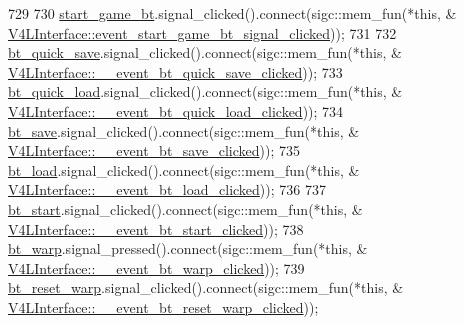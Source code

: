 \begin{DoxyCode}
729 
730         \hyperlink{class_v_s_s_s___g_u_i_1_1_v4_l_interface_a3785113cc8707c32049afd5b3f663383}{start\_game\_bt}.signal\_clicked().connect(sigc::mem\_fun(*\textcolor{keyword}{this}, &
      \hyperlink{class_v_s_s_s___g_u_i_1_1_v4_l_interface_a8c3f91048adebeb0b5aa9838053cdcfe}{V4LInterface::event\_start\_game\_bt\_signal\_clicked}));
731 
732         \hyperlink{class_v_s_s_s___g_u_i_1_1_v4_l_interface_a424118f056f71fba97d881f4647f7555}{bt\_quick\_save}.signal\_clicked().connect(sigc::mem\_fun(*\textcolor{keyword}{this}, &
      \hyperlink{class_v_s_s_s___g_u_i_1_1_v4_l_interface_a018c35ae221964d08f1abb40ba01abcf}{V4LInterface::\_\_event\_bt\_quick\_save\_clicked}));
733         \hyperlink{class_v_s_s_s___g_u_i_1_1_v4_l_interface_a7b72e731fab1a75270726fcd3936521e}{bt\_quick\_load}.signal\_clicked().connect(sigc::mem\_fun(*\textcolor{keyword}{this}, &
      \hyperlink{class_v_s_s_s___g_u_i_1_1_v4_l_interface_a3010084dff2d7f93eed40efaab8ee61b}{V4LInterface::\_\_event\_bt\_quick\_load\_clicked}));
734         \hyperlink{class_v_s_s_s___g_u_i_1_1_v4_l_interface_a961db9f4decd0e940ebd69fbb0cccc61}{bt\_save}.signal\_clicked().connect(sigc::mem\_fun(*\textcolor{keyword}{this}, &
      \hyperlink{class_v_s_s_s___g_u_i_1_1_v4_l_interface_a86cbf672edfd408bcac975be8dbacffd}{V4LInterface::\_\_event\_bt\_save\_clicked}));
735         \hyperlink{class_v_s_s_s___g_u_i_1_1_v4_l_interface_a4c726d738e66bc77323a038918d133ce}{bt\_load}.signal\_clicked().connect(sigc::mem\_fun(*\textcolor{keyword}{this}, &
      \hyperlink{class_v_s_s_s___g_u_i_1_1_v4_l_interface_a62894fc8a49716b44d3a3c6a445fe880}{V4LInterface::\_\_event\_bt\_load\_clicked}));
736 
737         \hyperlink{class_v_s_s_s___g_u_i_1_1_v4_l_interface_a95958ffffbfb95a6a0fdefb2ffa6d3b9}{bt\_start}.signal\_clicked().connect(sigc::mem\_fun(*\textcolor{keyword}{this}, &
      \hyperlink{class_v_s_s_s___g_u_i_1_1_v4_l_interface_ac83a8f5a54baf09ade5e3ec24ba91082}{V4LInterface::\_\_event\_bt\_start\_clicked}));
738         \hyperlink{class_v_s_s_s___g_u_i_1_1_v4_l_interface_a6cdcc092c26848cd7009e56084ee1b23}{bt\_warp}.signal\_pressed().connect(sigc::mem\_fun(*\textcolor{keyword}{this}, &
      \hyperlink{class_v_s_s_s___g_u_i_1_1_v4_l_interface_add951ff9c99d2d8027a27f86412007ab}{V4LInterface::\_\_event\_bt\_warp\_clicked}));
739         \hyperlink{class_v_s_s_s___g_u_i_1_1_v4_l_interface_af7e670a295f186a699859a285ea1cdbb}{bt\_reset\_warp}.signal\_clicked().connect(sigc::mem\_fun(*\textcolor{keyword}{this}, &
      \hyperlink{class_v_s_s_s___g_u_i_1_1_v4_l_interface_a0d852b1969af63e56f6d3efceb4604ff}{V4LInterface::\_\_event\_bt\_reset\_warp\_clicked}));

\end{DoxyCode}
